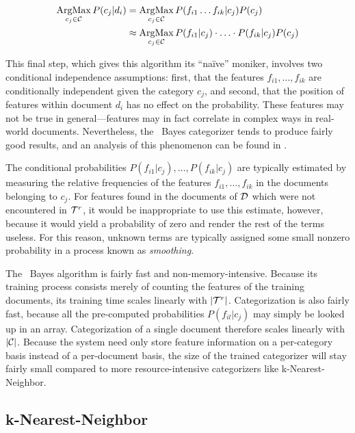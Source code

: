 \begin{align*}
\operatorname*{ArgMax}_{c_j\in\mathcal{C}} P(c_j|d_i) 
 & = \operatorname*{ArgMax}_{c_j\in\mathcal{C}} P(f_{i1} \ldots f_{ik}|c_j) P(c_j) \\
 & \approx \operatorname*{ArgMax}_{c_j\in\mathcal{C}} P(f_{i1}|c_j) \cdot \ldots \cdot P(f_{ik}|c_j) P(c_j) \\
\end{align*}

This final step, which gives this algorithm its ``na\"ive'' moniker,
involves two conditional independence assumptions: first, that the
features $f_{i1}, \ldots, f_{ik}$ are conditionally independent given
the category $c_j$, and second, that the position of features within
document $d_i$ has no effect on the probability.  These features may
not be true in general---features may in fact correlate in complex
ways in real-world documents.  Nevertheless, the \naive\ Bayes
categorizer tends to produce fairly good results, and an analysis of
this phenomenon can be found in \cite{domingos:97}.

The conditional probabilities $P(f_{i1}|c_j), \ldots, P(f_{ik}|c_j)$
are typically estimated by measuring the relative frequencies of the
features $f_{i1}, \ldots, f_{ik}$ in the documents belonging to
$c_j$.  For features found in the documents of $\mathcal{D}$ which were not
encountered in $\mathcal{T}^r$, it would be inappropriate to use this
estimate, however, because it would yield a probability of zero and
render the rest of the terms useless.  For this reason, unknown terms
are typically assigned some small nonzero probability in a process
known as \emph{smoothing}.

The \naive\ Bayes algorithm is fairly fast and non-memory-intensive.
Because its training process consists merely of counting the features
of the training documents, its training time scales linearly with
$|\mathcal{T}^r|$.  Categorization is also fairly fast, because all the
pre-computed probabilities $P(f_{il}|c_j)$ may simply be looked up in
an array.  Categorization of a single document therefore scales
linearly with $|\mathcal{C}|$.  Because the system need only store feature
information on a per-category basis instead of a per-document basis,
the size of the trained categorizer will stay fairly small compared to
more resource-intensive categorizers like k-Nearest-Neighbor.

\subsection{k-Nearest-Neighbor}
\label{knn}

